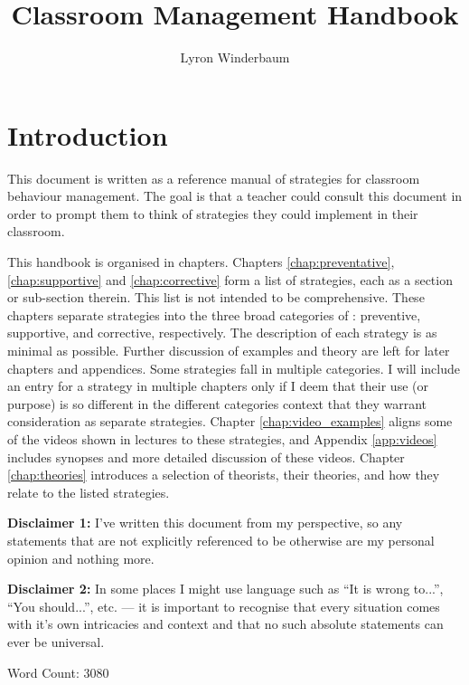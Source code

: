 \documentclass[12pt]{report}
\title{Classroom Management Handbook}
\author{Lyron Winderbaum}
\begin{document}
\maketitle

\tableofcontents

\chapter{Introduction}

This document is written as a reference manual of strategies for classroom behaviour management. The goal is that a teacher could consult this document in order to prompt them to think of strategies they could implement in their classroom.

This handbook is organised in chapters. Chapters \ref{chap:preventative}, \ref{chap:supportive} and \ref{chap:corrective} form a list of strategies, each as a section or sub-section therein.
This list is not intended to be comprehensive. These chapters separate strategies into the three broad categories of \cite{Charles2002}: preventive, supportive, and corrective, respectively. The description of each strategy is as minimal as possible. Further discussion of examples and theory are left for later chapters and appendices. Some strategies fall in multiple categories. I will include an entry for a strategy in multiple chapters only if I deem that their use (or purpose) is so different in the different categories context that they warrant consideration as separate strategies. Chapter \ref{chap:video_examples} aligns some of the videos shown in lectures to these strategies, and Appendix \ref{app:videos} includes synopses and more detailed discussion of these videos. Chapter \ref{chap:theories} introduces a selection of theorists, their theories, and how they relate to the listed strategies.

\textbf{Disclaimer 1:} I've written this document from my perspective, so any statements that are not explicitly referenced to be otherwise are my personal opinion and nothing more.

\textbf{Disclaimer 2:} In some places I might use language such as ``It is wrong to...'', ``You should...'', etc. --- it is important to recognise that every situation comes with it's own intricacies and context and that no such absolute statements can ever be universal.

Word Count: 3080\footnotemark 

\end{document}
